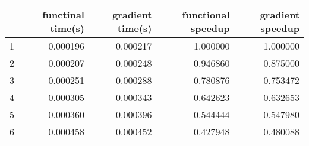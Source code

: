 \begin{tabular}{lrrrr}
\toprule
{} &  functinal time(s) &  gradient time(s) &  functional speedup &  gradient speedup \\
\midrule
1 &           0.000196 &          0.000217 &            1.000000 &          1.000000 \\
2 &           0.000207 &          0.000248 &            0.946860 &          0.875000 \\
3 &           0.000251 &          0.000288 &            0.780876 &          0.753472 \\
4 &           0.000305 &          0.000343 &            0.642623 &          0.632653 \\
5 &           0.000360 &          0.000396 &            0.544444 &          0.547980 \\
6 &           0.000458 &          0.000452 &            0.427948 &          0.480088 \\
\bottomrule
\end{tabular}
